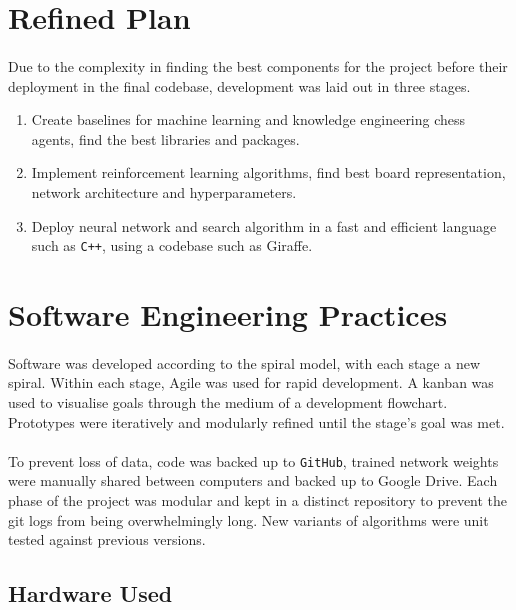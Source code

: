 \documentclass[12pt,a4paper]{book}
\begin{document}
\section{Refined Plan}

\paragraph{} Due to the complexity in finding the best components for the project before their deployment in the final codebase, development was laid out in three stages.

\begin{enumerate}
\item Create baselines for machine learning and knowledge engineering chess agents, find the best libraries and packages.
\item Implement reinforcement learning algorithms, find best board representation, network architecture and hyperparameters.
\item Deploy neural network and search algorithm in a fast and efficient language such as \texttt{C++}, using a codebase such as Giraffe.
\end{enumerate}
  
\section{Software Engineering Practices}

\paragraph{} Software was developed according to the spiral model, with each stage a new spiral. Within each stage, Agile was used for rapid development. A kanban was used to visualise goals through the medium of a development flowchart. Prototypes were iteratively and modularly refined until the stage's goal was met.

\paragraph{} To prevent loss of data, code was backed up to \texttt{GitHub}, trained network weights were manually shared between computers and backed up to Google Drive. Each phase of the project was modular and kept in a distinct repository to prevent the git logs from being overwhelmingly long. New variants of algorithms were unit tested against previous versions.

\subsection{Hardware Used}
\end{document}
